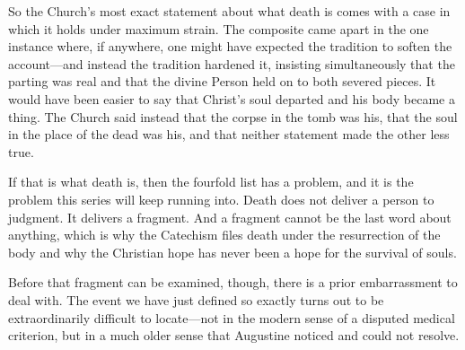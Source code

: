 So the Church's most exact statement about what death is comes with a case in which it holds under maximum strain. The composite came apart in the one instance where, if anywhere, one might have expected the tradition to soften the account---and instead the tradition hardened it, insisting simultaneously that the parting was real and that the divine Person held on to both severed pieces. It would have been easier to say that Christ's soul departed and his body became a thing. The Church said instead that the corpse in the tomb was his, that the soul in the place of the dead was his, and that neither statement made the other less true.

If that is what death is, then the fourfold list has a problem, and it is the problem this series will keep running into. Death does not deliver a person to judgment. It delivers a fragment. And a fragment cannot be the last word about anything, which is why the Catechism files death under the resurrection of the body and why the Christian hope has never been a hope for the survival of souls.

Before that fragment can be examined, though, there is a prior embarrassment to deal with. The event we have just defined so exactly turns out to be extraordinarily difficult to locate---not in the modern sense of a disputed medical criterion, but in a much older sense that Augustine noticed and could not resolve.
